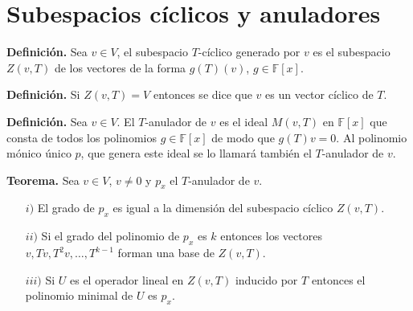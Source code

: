 \newpage

\section{Subespacios cíclicos y anuladores}

\textbf{Definición.} Sea $v\in V$, el subespacio $T$-cíclico
generado por $v$ es el subespacio $Z(v, T)$ de los vectores
de la forma $g(T)(v)$, $g \in \mathbb{F}[x]$.

\textbf{Definición.} Si $Z(v, T) = V$ entonces se dice
que $v$ es un vector cíclico de $T$.

\textbf{Definición.} Sea $v\in V$. El $T$-anulador de $v$ es
el ideal $M (v, T)$ en $\mathbb{F}[x]$ que consta de todos
los polinomios $g \in \mathbb{F}[x]$ de modo que $g(T)v = 0$.
Al polinomio mónico único $p$, que genera este ideal se lo
llamará también el $T$-anulador de $v$.

\textbf{Teorema.}
Sea $v\in V$, $v\not = 0$ y $p_x$ el $T$-anulador de $v$.
\begin{itemize}
    \item[$i)$] El grado de $p_x$ es igual a la dimensión del
    subespacio cíclico $Z(v, T)$.
    \item[$ii)$] Si el grado del polinomio de $p_x$ es $k$
    entonces los vectores $v, Tv, T^{2}v,\dots, T^{k-1}$ forman
    una base de $Z(v, T)$.
    \item[$iii)$] Si $U$ es el operador lineal en $Z(v, T)$
    inducido por $T$ entonces el polinomio minimal de $U$ es $p_x$.
\end{itemize}